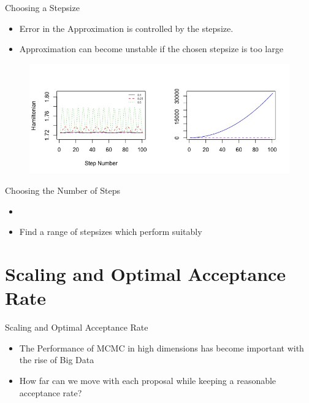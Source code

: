 \documentclass{beamer}
\begin{document}
\begin{frame}{Choosing a Stepsize}

\begin{itemize}

\item Error in the Approximation is controlled by the stepsize. \vskip 5mm

\item Approximation can become unstable if the chosen stepsize is too large \vskip 5mm
\end{itemize}

\begin{figure}
\includegraphics[scale = 0.3]{Leapfrog_Errors.jpeg}
\end{figure}

\end{frame}


\begin{frame}{Choosing the Number of Steps}

\begin{itemize}
\item  \vskip 5mm

\item Find a range of stepsizes which perform suitably \vskip 5mm
\end{itemize}

\end{frame}




\section{Scaling and Optimal Acceptance Rate}


\begin{frame}{Scaling and Optimal Acceptance Rate}

\begin{itemize}

\item  The Performance of MCMC in high dimensions has become important with the rise of Big Data \vskip 5mm

\item How far can we move with each proposal while keeping a reasonable acceptance rate? \vskip 5mm

\end{itemize}

\end{frame}
\end{document}
